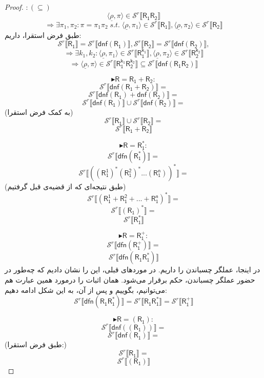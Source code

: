 \begin{proof}
	$:(\subseteq)$
	$$\langle \underline{\rho} ,\pi \rangle \in \mathcal{S}^r \llbracket \mathsf{R_1 R_2} \rrbracket$$
	$$\Rightarrow\exists \pi_1, \pi_2: \pi = \pi_1 \pi_2\;s.t.\;
	\langle \underline{\rho} , \pi_1 \rangle \in \mathcal{S}^r \llbracket \mathsf{R_1} \rrbracket
	,\langle \underline{\rho} , \pi_2 \rangle \in \mathcal{S}^r \llbracket \mathsf{R_2} \rrbracket$$
	طبق فرض استقرا، داریم:
	$$\mathcal{S}^r \llbracket \mathsf{R_1} \rrbracket=
	\mathcal{S}^r \llbracket \mathsf{dnf(R_1)} \rrbracket,
	\mathcal{S}^r \llbracket \mathsf{R_2} \rrbracket=
	\mathcal{S}^r \llbracket \mathsf{dnf(R_2)} \rrbracket,
	$$
	$$\Rightarrow
	\exists k_1,k_2: \langle \underline{\rho} , \pi_1 \rangle \in 
	\mathcal{S}^r \llbracket \mathsf{R_1^{k_1}} \rrbracket,
	\langle \underline{\rho} , \pi_2 \rangle \in 
	\mathcal{S}^r \llbracket \mathsf{R_2^{k_2}} \rrbracket$$
	$$\Rightarrow
	\langle \underline{\rho} , \pi \rangle \in
	\mathcal{S}^r \llbracket \mathsf{R_1^{k_1} R_2^{k_2}} \rrbracket
	\subseteq \mathcal{S}^r \llbracket \mathsf{dnf(R_1 R_2)} \rrbracket
	$$ 
	
	
	$$\blacktriangleright \mathsf{R=R_1 + R_2:}$$	
	$$\mathcal{S}^r \llbracket \mathsf{dnf(R_1+R_2)} \rrbracket=$$
	$$\mathcal{S}^r \llbracket \mathsf{dnf(R_1)+dnf(R_2)} \rrbracket=$$
	$$\mathcal{S}^r \llbracket \mathsf{dnf(R_1)} \rrbracket \cup
	\mathcal{S}^r \llbracket \mathsf{dnf(R_2)} \rrbracket=$$
	(به کمک فرض استقرا)
	$$\mathcal{S}^r \llbracket \mathsf{R_1} \rrbracket \cup
	\mathcal{S}^r \llbracket \mathsf{R_2} \rrbracket=$$
	$$\mathcal{S}^r \llbracket \mathsf{R_1+R_2} \rrbracket$$
	
	$$\blacktriangleright \mathsf{R=R_1^*:}$$
	$$\mathcal{S}^r \llbracket \mathsf{dfn(R_1^*)} \rrbracket=$$
	$$\mathcal{S}^r \llbracket \mathsf{((R_1^1)^* (R_1^2)^* ... (R_1^n))^*} \rrbracket=$$
	(طبق نتیجه‌ای که از قضیه‌ی قبل گرفتیم)
	$$\mathcal{S}^r \llbracket \mathsf{(R_1^1+R_1^2+...+R_1^n)^*} \rrbracket=$$
	$$\mathcal{S}^r \llbracket \mathsf{(R_1)^*} \rrbracket=$$
	$$\mathcal{S}^r \llbracket \mathsf{R_1^*} \rrbracket$$
	
	$$\blacktriangleright \mathsf{R=R_1^+:}$$
	$$\mathcal{S}^r \llbracket \mathsf{dfn(R_1^+)} \rrbracket=$$
	$$\mathcal{S}^r \llbracket \mathsf{dfn(R_1 R_1^*)} \rrbracket$$
	در اینجا، عملگر چسباندن را داریم. در موردهای قبلی، این را نشان دادیم که چه‌طور در حضور عملگر چسباندن، حکم برقرار می‌شود. همان اثبات را درمورد همین عبارت هم می‌توانیم، بگوییم و پس از آن، به این شکل ادامه دهیم:
	$$\mathcal{S}^r \llbracket \mathsf{dfn(R_1 R_1^*)} \rrbracket=
	\mathcal{S}^r \llbracket \mathsf{R_1 R_1^*} \rrbracket=
	\mathcal{S}^r \llbracket \mathsf{R_1^+} \rrbracket$$
	
	$$\blacktriangleright \mathsf{R=(R_1):}$$
	$$\mathcal{S}^r \llbracket \mathsf{dnf((R_1))} \rrbracket=$$
	$$\mathcal{S}^r \llbracket \mathsf{dnf(R_1)} \rrbracket=$$
	(طبق فرض استقرا:)
	$$\mathcal{S}^r \llbracket \mathsf{R_1} \rrbracket=$$
	$$\mathcal{S}^r \llbracket \mathsf{(R_1)} \rrbracket$$
\end{proof}


